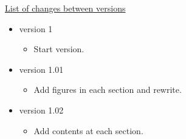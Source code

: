 \underline{List of changes between versions}

\begin{itemize}


\item version 1 
\begin{itemize}
\item Start version.
\end{itemize}

\item version 1.01
\begin{itemize}
\item Add figures in each section and rewrite.
\end{itemize}

\item version 1.02
\begin{itemize}
\item Add contents at each section.
\end{itemize}

\end{itemize}

\clearpage

